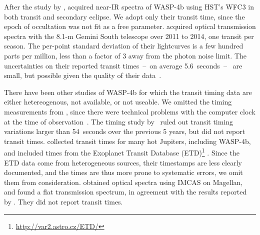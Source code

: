 \documentclass[12pt,twocolumn,tighten]{aastex62}
\begin{document}
After the study by \citet{hoyer_tramos_2013},
\citet{ranjan_atmospheric_2014} acquired near-IR spectra of WASP-4b
using HST's WFC3 in both transit and secondary eclipse.  We adopt only
their transit time, since the epoch of occultation was not fit as a free
parameter.  \citet{huitson_gemini_2017} acquired optical transmission
spectra with the 8.1-m Gemini South telescope over 2011 to 2014, one
transit per season.  The per-point standard deviation of their
lightcurves is a few hundred parts per million, less than a factor of 3
away from the photon noise limit.  The uncertainties on their reported
transit times~--~on average 5.6~seconds~--~ are small, but possible
given the quality of their data~\citep[cf.][]{carter_analytic_2008}.

There have been other studies of WASP-4b for which the transit timing
data are either hetereogenous, not available, or not useable.  We
omitted the timing measurements from
\citet{southworth_high-precision_2009}, since there were technical
problems with the computer clock at the time of
observation~\citep{nikolov_wasp-4b_2012}.  The timing study
by~\citet{petrucci_no_2013} ruled out transit timing variations larger
than 54~seconds over the previous 5 years, but did not report transit
times.  \citet{baluev_benchmarking_2015} collected transit times for
many hot Jupiters, including WASP-4b, and included times from the
Exoplanet Transit Database
(ETD)\footnote{\url{http://var2.astro.cz/ETD/}}
\citep{poddany_ETD_2010}.  Since the ETD data come from heterogeneous
sources, their timestamps are less clearly documented, and the times
are thus more prone to systematic errors, we omit them from
consideration.
\citet{may_mopss_2018} obtained optical spectra using IMCAS on
Magellan, and found a flat transmission spectrum, in agreement with
the results reported by \citet{huitson_gemini_2017}.  They did not
report transit times.
\end{document}
